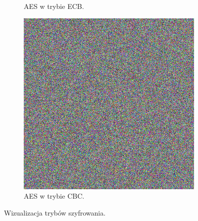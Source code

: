 \begin{figure}
\begin{subfigure}{0.3\textwidth}
        \caption{AES w trybie ECB.}
        \label{fig:logo-ecb}
    \end{subfigure}
    \begin{subfigure}{0.3\textwidth}
        \includegraphics[width=\textwidth]{content/images/logo-cbc}
        \caption{AES w trybie CBC.}
        \label{fig:logo-cbc}
    \end{subfigure}
    \caption{Wizualizacja trybów szyfrowania.}
    \label{modes}
\end{figure} 

